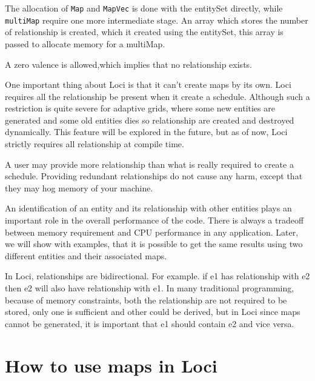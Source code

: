 \par The allocation of {\tt Map} and {\tt MapVec} is done with the entitySet
directly, while {\tt multiMap} require one more intermediate stage. An
array which stores the number of relationship is created, which it 
created using the entitySet, this array is passed to allocate memory
for a multiMap.  
\par A zero valence is allowed,which implies that no relationship exists.
%
\par One important thing about Loci is that it can't create maps by its own.
Loci requires all the relationship be present when it create a schedule. Although
such a restriction is quite severe for adaptive grids, where some new entities
are generated and some old entities dies so relationship are created and
destroyed dynamically. This feature will be explored in the future,
but as of now, Loci strictly requires all relationship at compile time.
%
\par A user may provide more relationship than what is really required to 
create a schedule. Providing redundant relationships do not cause any harm,
except that they may hog memory of your machine. 
%
\par An identification of an entity and its relationship with other entities
plays an important role in the overall performance of the code. There is always
a tradeoff between memory requirement and CPU performance in any application.
Later, we will show with examples, that it is possible to get the same results using
two different entities and their associated maps.

\par In Loci, relationships are bidirectional.  For example. if e1 has relationship
with e2 then e2 will also have relationship with e1. In many traditional programming, 
because of memory constraints, both the relationship are not required to be stored, 
only one is sufficient and other could be derived, but in Loci since maps cannot
be generated, it is important that e1 should contain e2 and vice versa.

\section { How to use maps in Loci}

